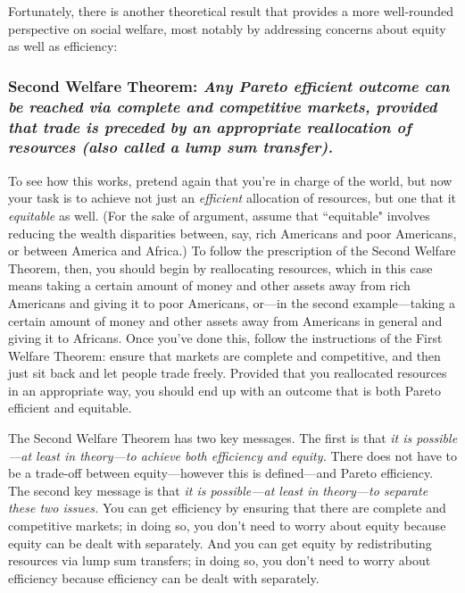 Fortunately, there is another theoretical result that provides a more well-rounded perspective on social welfare, most notably by addressing concerns about equity as well as efficiency:

\subsubsection*{Second Welfare Theorem: \it Any \rm Pareto efficient outcome can be reached via complete and competitive markets, provided that trade is preceded by an appropriate reallocation of resources (also called a \textbf{lump sum transfer}).}

To see how this works, pretend again that you're in charge of the world, but now your task is to achieve not just an \emph{efficient} allocation of resources, but one that it \emph{equitable} as well. (For the sake of argument, assume that ``equitable" involves reducing the wealth disparities between, say, rich Americans and poor Americans, or between America and Africa.) To follow the prescription of the Second Welfare Theorem, then, you should begin by reallocating resources, which in this case means taking a certain amount of money and other assets away from rich Americans and giving it to poor Americans, or---in the second example---taking a certain amount of money and other assets away from Americans in general and giving it to Africans. Once you've done this, follow the instructions of the First Welfare Theorem: ensure that markets are complete and competitive, and then just sit back and let people trade freely. Provided that you reallocated resources in an appropriate way, you should end up with an outcome that is both Pareto efficient and equitable.

The Second Welfare Theorem has two key messages. The first is that \emph{it is possible---at least in theory---to achieve both efficiency and equity.} There does not have to be a trade-off between equity---however this is defined---and Pareto efficiency. The second key message is that \emph{it is possible---at least in theory---to separate these two issues.} You can get efficiency by ensuring that there are complete and competitive markets; in doing so, you don't need to worry about equity because equity can be dealt with separately. And you can get equity by redistributing resources via lump sum transfers; in doing so, you don't need to worry about efficiency because efficiency can be dealt with separately.


